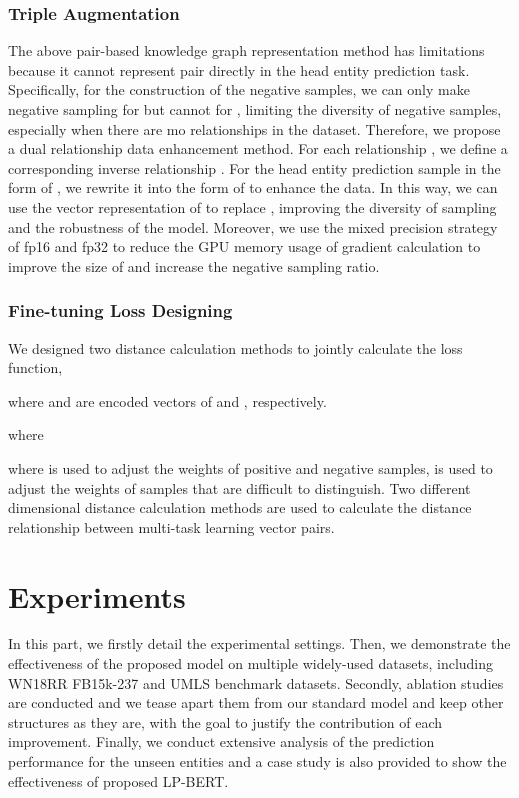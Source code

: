 \documentclass[journal]{IEEEtran}
\begin{document}
\subsubsection{Triple Augmentation}
The above pair-based knowledge graph representation method has limitations because it cannot represent  pair directly in the head entity prediction task. Specifically, for the construction of the negative samples, we can only make negative sampling for  but cannot for , limiting the diversity of negative samples, especially when there are mo relationships in the dataset. 
Therefore, we propose a dual relationship data enhancement method. For each relationship , we define a corresponding inverse relationship . For the head entity prediction sample in the form of , we rewrite it into the form of  to enhance the data. 
In this way, we can use the vector representation of  to replace , improving the diversity of sampling and the robustness of the model. Moreover, we use the mixed precision strategy of fp16 and fp32 to reduce the GPU memory usage of gradient calculation to improve the size of  and increase the negative sampling ratio. 


\subsubsection{Fine-tuning Loss Designing}

We designed two distance calculation methods to jointly calculate the loss function,

where  and  are encoded vectors of  and , respectively.
\begin{small}


\end{small}
where

where  is used to adjust the weights of positive and negative samples,  is used to adjust the weights of samples that are difficult to distinguish. Two different dimensional distance calculation methods are used to calculate the distance relationship between multi-task learning vector pairs.



\section{Experiments}{\label{exp}}

In this part, we firstly detail the experimental settings. Then, we demonstrate the effectiveness of the proposed model on multiple widely-used datasets, including WN18RR \cite{dettmers2018convolutional} FB15k-237 \cite{toutanova2015representing} and UMLS \cite{dettmers2018convolutional} benchmark datasets. Secondly, ablation studies are conducted and we tease apart them from our standard model and keep other structures as they are, with the goal to justify the contribution of each improvement. Finally, we conduct extensive analysis of the prediction performance for the unseen entities and a case study is also provided to show the effectiveness of proposed LP-BERT.
\end{document}
